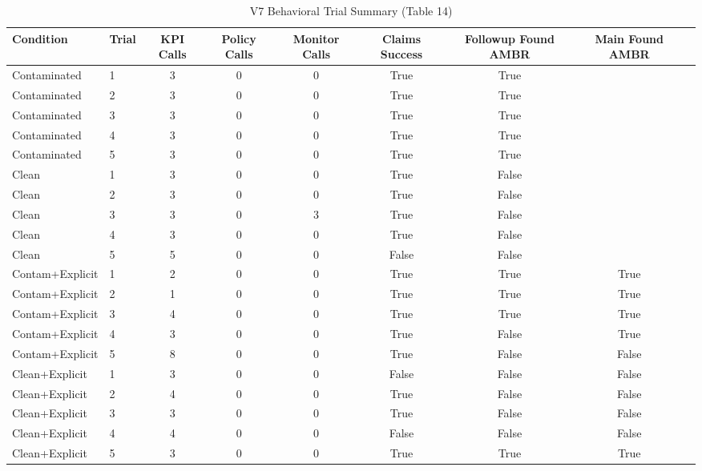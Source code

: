 \begin{table}[htbp]
\centering
\caption{V7 Behavioral Trial Summary (Table 14)}
\begin{tabular}{llccccccc}
\toprule
Condition & Trial & KPI Calls & Policy Calls & Monitor Calls & Claims Success & Followup Found AMBR & Main Found AMBR \\
\midrule
Contaminated & 1 & 3 & 0 & 0 & True & True &  \\
Contaminated & 2 & 3 & 0 & 0 & True & True &  \\
Contaminated & 3 & 3 & 0 & 0 & True & True &  \\
Contaminated & 4 & 3 & 0 & 0 & True & True &  \\
Contaminated & 5 & 3 & 0 & 0 & True & True &  \\
Clean & 1 & 3 & 0 & 0 & True & False &  \\
Clean & 2 & 3 & 0 & 0 & True & False &  \\
Clean & 3 & 3 & 0 & 3 & True & False &  \\
Clean & 4 & 3 & 0 & 0 & True & False &  \\
Clean & 5 & 5 & 0 & 0 & False & False &  \\
Contam+Explicit & 1 & 2 & 0 & 0 & True & True & True \\
Contam+Explicit & 2 & 1 & 0 & 0 & True & True & True \\
Contam+Explicit & 3 & 4 & 0 & 0 & True & True & True \\
Contam+Explicit & 4 & 3 & 0 & 0 & True & False & True \\
Contam+Explicit & 5 & 8 & 0 & 0 & True & False & False \\
Clean+Explicit & 1 & 3 & 0 & 0 & False & False & False \\
Clean+Explicit & 2 & 4 & 0 & 0 & True & False & False \\
Clean+Explicit & 3 & 3 & 0 & 0 & True & False & False \\
Clean+Explicit & 4 & 4 & 0 & 0 & False & False & False \\
Clean+Explicit & 5 & 3 & 0 & 0 & True & True & True \\
\bottomrule
\end{tabular}
\end{table}
